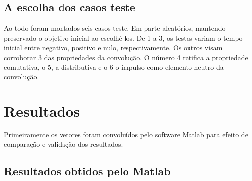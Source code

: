 \documentclass[dvipdfm, a4paper, 11pt]{report}
\begin{document}
{{\begin{lstlisting}[language = python]
\end{lstlisting}
}
\section{A escolha dos casos teste}

Ao todo foram montados seis casos teste. Em parte aleatórios, mantendo preservado o objetivo inicial ao escolhê-los.
De 1 a 3, os testes variam o tempo inicial entre negativo, positivo e nulo, respectivamente. Os outros visam corroborar 3 das propriedades da convolução. O número 4 ratifica a propriedade comutativa, o 5, a distributiva e o 6 o impulso como elemento neutro da convolução.

\chapter{Resultados}\label{result}
Primeiramente os vetores foram convoluídos pelo software Matlab para efeito de comparação e validação dos resultados.
\section{Resultados obtidos pelo Matlab}

}
\end{document}
